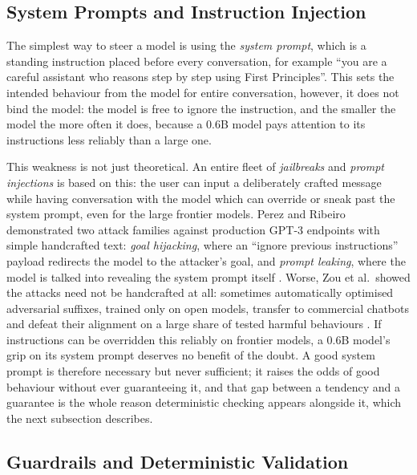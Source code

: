 \subsection{System Prompts and Instruction Injection}
\label{subsec:system-prompts-and-instruction-injection}


The simplest way to steer a model is using the \emph{system prompt}, which is a standing instruction placed before every conversation, for example ``you are a careful assistant who reasons step by step using First Principles''. This sets the intended behaviour from the model for entire conversation, however, it does not bind the model: the model is free to ignore the instruction, and the smaller the model the more often it does, because a 0.6B model pays attention to its instructions less reliably than a large one.

This weakness is not just theoretical. An entire fleet of \emph{jailbreaks} and \emph{prompt injections} is based on this: the user can input a deliberately crafted message while having conversation with the model which can override or sneak past the system prompt, even for the large frontier models. Perez and Ribeiro demonstrated two attack families against production GPT-3 endpoints with simple handcrafted text: \emph{goal hijacking}, where an ``ignore previous instructions'' payload redirects the model to the attacker's goal, and \emph{prompt leaking}, where the model is talked into revealing the system prompt itself \cite{perez2022ignorepreviouspromptattack}. Worse, Zou et al.\ showed the attacks need not be handcrafted at all: sometimes automatically optimised adversarial suffixes, trained only on open models, transfer to commercial chatbots and defeat their alignment on a large share of tested harmful behaviours \cite{zou2023universaltransferableadversarialattacks}. If instructions can be overridden this reliably on frontier models, a 0.6B model's grip on its system prompt deserves no benefit of the doubt. A good system prompt is therefore necessary but never sufficient; it raises the odds of good behaviour without ever guaranteeing it, and that gap between a tendency and a guarantee is the whole reason deterministic checking appears alongside it, which the next subsection describes.

\subsection{Guardrails and Deterministic Validation}
\label{subsec:guardrails-validation}

